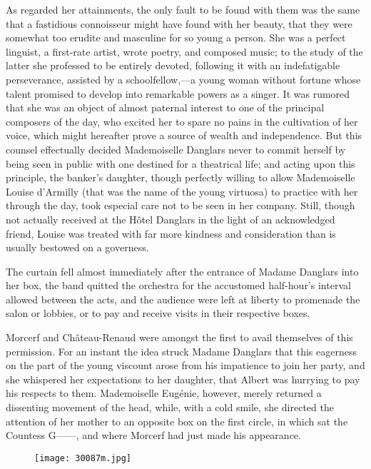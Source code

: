 As regarded her attainments, the only fault to be found with them was
the same that a fastidious connoisseur might have found with her
beauty, that they were somewhat too erudite and masculine for so young
a person. She was a perfect linguist, a first-rate artist, wrote
poetry, and composed music; to the study of the latter she professed to
be entirely devoted, following it with an indefatigable perseverance,
assisted by a schoolfellow,—a young woman without fortune whose talent
promised to develop into remarkable powers as a singer. It was rumored
that she was an object of almost paternal interest to one of the
principal composers of the day, who excited her to spare no pains in
the cultivation of her voice, which might hereafter prove a source of
wealth and independence. But this counsel effectually decided
Mademoiselle Danglars never to commit herself by being seen in public
with one destined for a theatrical life; and acting upon this
principle, the banker’s daughter, though perfectly willing to allow
Mademoiselle Louise d’Armilly (that was the name of the young virtuosa)
to practice with her through the day, took especial care not to be seen
in her company. Still, though not actually received at the Hôtel
Danglars in the light of an acknowledged friend, Louise was treated
with far more kindness and consideration than is usually bestowed on a
governess.

The curtain fell almost immediately after the entrance of Madame
Danglars into her box, the band quitted the orchestra for the
accustomed half-hour’s interval allowed between the acts, and the
audience were left at liberty to promenade the salon or lobbies, or to
pay and receive visits in their respective boxes.

Morcerf and Château-Renaud were amongst the first to avail themselves
of this permission. For an instant the idea struck Madame Danglars that
this eagerness on the part of the young viscount arose from his
impatience to join her party, and she whispered her expectations to her
daughter, that Albert was hurrying to pay his respects to them.
Mademoiselle Eugénie, however, merely returned a dissenting movement of
the head, while, with a cold smile, she directed the attention of her
mother to an opposite box on the first circle, in which sat the
Countess G——, and where Morcerf had just made his appearance.

\begin{figure}[ht]
\texttt{[image: 30087m.jpg]}
\end{figure}

